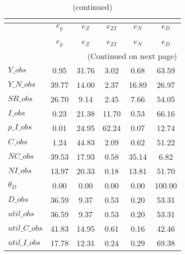  
\begin{center}
\begin{longtable}{lccccc} 
\caption{VARIANCE DECOMPOSITION (in percent)}\\
 \label{Table:th_var_decomp_uncond}\\
\toprule 
$              $	 & 	 $       {e_g}$	 & 	 $       {e_Z}$	 & 	 $    {e_{ZI}}$	 & 	 $       {e_N}$	 & 	 $       {e_D}$\\
\midrule \endfirsthead 
\caption{(continued)}\\
 \toprule \\ 
$              $	 & 	 $       {e_g}$	 & 	 $       {e_Z}$	 & 	 $    {e_{ZI}}$	 & 	 $       {e_N}$	 & 	 $       {e_D}$\\
\midrule \endhead 
\midrule \multicolumn{6}{r}{(Continued on next page)} \\ \bottomrule \endfoot 
\bottomrule \endlastfoot 
$Y\_obs        $	 & 	        0.95	 & 	       31.76	 & 	        3.02	 & 	        0.68	 & 	       63.59 \\ 
$Y\_N\_obs     $	 & 	       39.77	 & 	       14.00	 & 	        2.37	 & 	       16.89	 & 	       26.97 \\ 
$SR\_obs       $	 & 	       26.70	 & 	        9.14	 & 	        2.45	 & 	        7.66	 & 	       54.05 \\ 
$I\_obs        $	 & 	        0.23	 & 	       21.38	 & 	       11.70	 & 	        0.53	 & 	       66.16 \\ 
$p\_I\_obs     $	 & 	        0.01	 & 	       24.95	 & 	       62.24	 & 	        0.07	 & 	       12.74 \\ 
$C\_obs        $	 & 	        1.24	 & 	       44.83	 & 	        2.09	 & 	        0.62	 & 	       51.22 \\ 
$NC\_obs       $	 & 	       39.53	 & 	       17.93	 & 	        0.58	 & 	       35.14	 & 	        6.82 \\ 
$NI\_obs       $	 & 	       13.97	 & 	       20.33	 & 	        0.18	 & 	       13.81	 & 	       51.70 \\ 
${\theta_D}    $	 & 	        0.00	 & 	        0.00	 & 	        0.00	 & 	        0.00	 & 	      100.00 \\ 
$D\_obs        $	 & 	       36.59	 & 	        9.37	 & 	        0.53	 & 	        0.20	 & 	       53.31 \\ 
$util\_obs     $	 & 	       36.59	 & 	        9.37	 & 	        0.53	 & 	        0.20	 & 	       53.31 \\ 
$util\_C\_obs  $	 & 	       41.83	 & 	       14.95	 & 	        0.61	 & 	        0.16	 & 	       42.46 \\ 
$util\_I\_obs  $	 & 	       17.78	 & 	       12.31	 & 	        0.24	 & 	        0.29	 & 	       69.38 \\ 
\end{longtable}
 \end{center}
